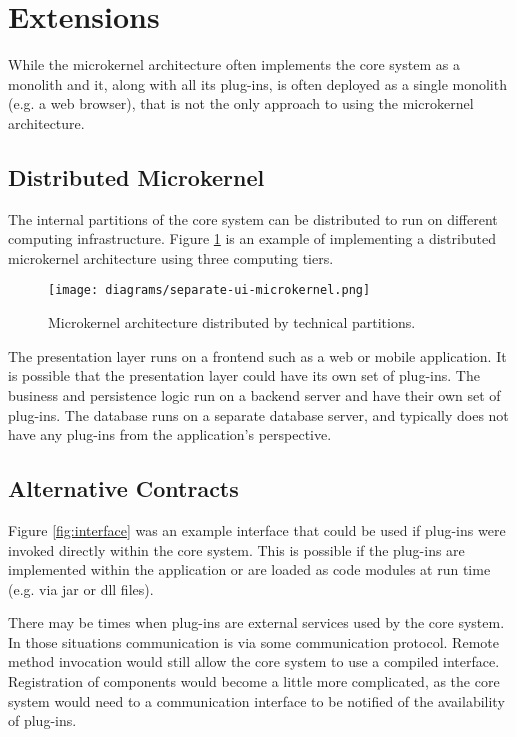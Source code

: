 \section{Extensions}

While the microkernel architecture often implements the core system as a monolith
and it, along with all its plug-ins, is often deployed as a single monolith
(e.g. a web browser), that is not the only approach to using the microkernel architecture.

\subsection{Distributed Microkernel}

The internal partitions of the core system can be distributed to run on different computing infrastructure.
Figure \ref{fig:3-tier-microkernel} is an example of implementing a distributed microkernel architecture using three computing tiers.

\begin{figure}[h!]
    \centering
    \texttt{[image: diagrams/separate-ui-microkernel.png]}
    \caption{Microkernel architecture distributed by technical partitions.}
    \label{fig:3-tier-microkernel}
\end{figure}

The presentation layer runs on a frontend such as a web or mobile application.
It is possible that the presentation layer could have its own set of plug-ins.
The business and persistence logic run on a backend server and have their own set of plug-ins.
The database runs on a separate database server, and typically does not have any plug-ins from the application's perspective.

\subsection{Alternative Contracts}

Figure \ref{fig:interface} was an example interface that could be used if plug-ins were invoked directly within the core system.
This is possible if the plug-ins are implemented within the application or are loaded as code modules at run time (e.g. via jar or dll files).

There may be times when plug-ins are external services used by the core system.
In those situations communication is via some communication protocol.
Remote method invocation would still allow the core system to use a compiled interface.
Registration of components would become a little more complicated,
as the core system would need to a communication interface to be notified of the availability of plug-ins.

